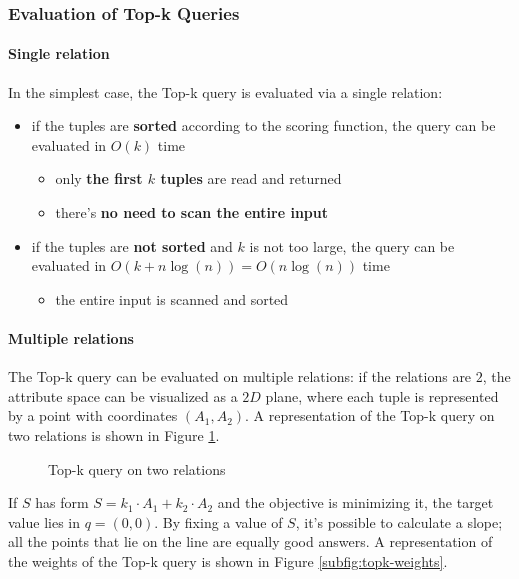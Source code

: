 \documentclass[english]{article}
\begin{document}
\subsubsection{Evaluation of Top-k Queries}

\paragraph{Single relation}

In the simplest case, the Top-k query is evaluated via a single relation:
\begin{itemize}
  \item if the tuples are \textbf{sorted} according to the scoring function, the query can be evaluated in \(O(k)\) time
        \begin{itemize}
          \item only \textbf{the first \(k\) tuples} are read and returned
          \item there's \textbf{no need to scan the entire input}
        \end{itemize}
  \item if the tuples are \textbf{not sorted} and \(k\) is not too large, the query can be evaluated in \(O(k + n\log(n)) = O(n\log(n))\) time
        \begin{itemize}
          \item the entire input is scanned and sorted
        \end{itemize}
\end{itemize}

\paragraph{Multiple relations}

The Top-k query can be evaluated on multiple relations: if the relations are \(2\), the attribute space can be visualized as a \(2D\) plane, where each tuple is represented by a point with coordinates \(\left( A_1, A_2 \right)\).
A representation of the Top-k query on two relations is shown in Figure \ref{fig:topk-2d-plane}.

\begin{figure}[htbp]
  \centering
  \bigskip
  \caption{Top-k query on two relations}
  \label{fig:topk-2d-plane}
  \bigskip
\end{figure}

If \(S\) has form \(S = k_1 \cdot A_1 + k_2 \cdot A_2\) and the objective is minimizing it, the target value lies in \(q = \left( 0, 0 \right)\).
By fixing a value of \(S\), it's possible to calculate a slope; all the points that lie on the line are equally good answers.
A representation of the weights of the Top-k query is shown in Figure \ref{subfig:topk-weights}.
\end{document}
